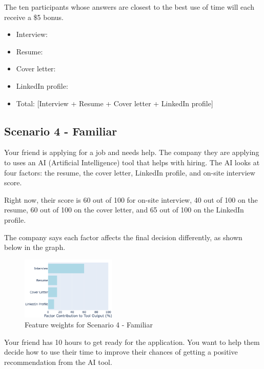 The ten participants whose answers are closest to the best use of time will each receive a \$5 bonus.

\begin{itemize}
    \item Interview: \underline{\hspace{3cm}}
    \item Resume: \underline{\hspace{3cm}}
    \item Cover letter: \underline{\hspace{3cm}}
    \item LinkedIn profile: \underline{\hspace{3cm}}
    \item Total: [Interview + Resume + Cover letter + LinkedIn profile]
\end{itemize}


\subsection{Scenario 4 - Familiar}
Your friend is applying for a job and needs help. The company they are applying to uses an AI (Artificial Intelligence) tool that helps with hiring. The AI looks at four factors: the resume, the cover letter, LinkedIn profile, and on-site interview score.

Right now, their score is 60 out of 100 for on-site interview, 40 out of 100 on the resume, 60 out of 100 on the cover letter, and 65 out of 100 on the LinkedIn profile.

The company says each factor affects the final decision differently, as shown below in the graph.
\begin{figure}[ht]
    \centering
    \includegraphics[width=0.4\textwidth]{Figures/4-unequal.png}
    \caption{Feature weights for Scenario 4 - Familiar}
    \label{fig:survey-weights-scenario4}
\end{figure}

Your friend has 10 hours to get ready for the application. You want to help them decide how to use their time to improve their chances of getting a positive recommendation from the AI tool.

